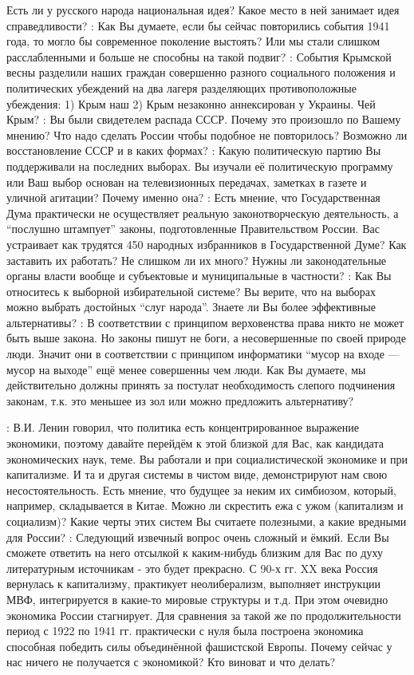 \begin{drama}
	Есть ли у русского народа национальная идея? Какое место в ней занимает идея справедливости? 
	\maxspeaks: Как Вы думаете, если бы сейчас повторились события 1941 года, то могло бы современное поколение  выстоять? Или мы стали слишком расслабленными и больше не способны на такой подвиг?
	\maxspeaks: События Крымской весны разделили наших граждан совершенно разного социального положения и политических убеждений на два лагеря разделяющих противоположные убеждения: 1) Крым наш 2) Крым незаконно аннексирован у Украины. Чей Крым?
	\maxspeaks: Вы были свидетелем распада СССР. Почему это произошло по Вашему мнению? Что надо сделать России чтобы подобное не повторилось? Возможно ли восстановление СССР и в каких формах?
	\maxspeaks: Какую политическую партию Вы поддерживали на последних выборах. Вы изучали её политическую программу или Ваш выбор основан на телевизионных передачах, заметках в газете и уличной агитации? Почему именно она? 
	\maxspeaks: Есть мнение, что Государственная Дума практически не осуществляет реальную законотворческую деятельность, а “послушно штампует” законы, подготовленные Правительством России. Вас устраивает как трудятся 450 народных избранников в Государственной Думе? Как заставить их работать? Не слишком ли их много? Нужны ли законодательные органы власти вообще и субъектовые и муниципальные в частности?
	\maxspeaks: Как Вы относитесь к выборной избирательной системе? Вы верите, что на выборах можно выбрать достойных “слуг народа”. Знаете ли Вы более эффективные альтернативы?
	\maxspeaks: В соответствии с принципом верховенства права никто не может быть выше закона. Но законы пишут не боги, а несовершенные по своей природе люди. Значит они в соответствии с принципом информатики “мусор на входе — мусор на выходе”  ещё менее совершенны чем люди. Как Вы думаете, мы действительно должны принять за постулат необходимость слепого подчинения законам, т.к. это меньшее из зол или можно предложить альтернативу?  
	
	\maxspeaks: В.И. Ленин говорил, что политика есть концентрированное выражение экономики, поэтому давайте перейдём к этой близкой для Вас, как кандидата экономических наук, теме. Вы работали и при социалистической экономике и при капитализме. И та и другая системы в чистом виде, демонстрируют нам свою несостоятельность. Есть мнение, что будущее за неким их симбиозом, который, например, складывается в Китае. Можно ли скрестить ежа с ужом (капитализм и социализм)? Какие черты этих систем Вы считаете полезными, а какие вредными для России? 
	\maxspeaks: Следующий извечный вопрос очень сложный и ёмкий. Если Вы сможете ответить на него отсылкой к каким-нибудь близким для Вас по духу литературным источникам - это будет прекрасно. С 90-х гг. XX века Россия вернулась к капитализму, практикует неолиберализм, выполняет инструкции МВФ, интегрируется в какие-то мировые структуры и т.д. При этом очевидно экономика России стагнирует. Для сравнения за такой же по продолжительности период с 1922 по 1941 гг. практически с нуля была построена экономика способная победить силы объединённой фашистской Европы. Почему сейчас у нас ничего не получается с экономикой?  Кто виноват и что делать? 


\end{drama}
